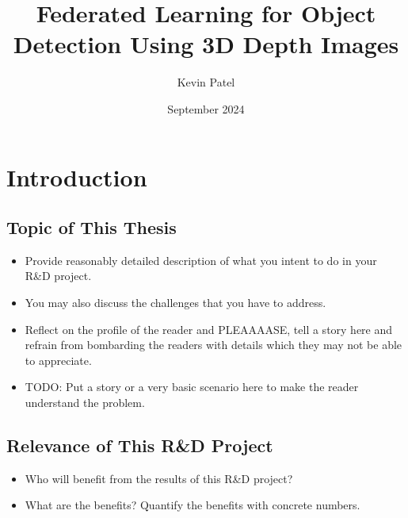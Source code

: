 \documentclass[thesis]{mas_proposal}
\title{Federated Learning for Object Detection Using 3D Depth Images}
\author{Kevin Patel}
\date{September 2024}
\begin{document}
\maketitle

\pagestyle{plain}

\section{Introduction}

\subsection{Topic of This Thesis}
\begin{itemize}
      \item Provide reasonably detailed description of what you intent to do in your R\&D project.
      \item You may also discuss the challenges that you have to address.
      \item Reflect on the profile of the reader and PLEAAAASE, tell a story here and refrain from bombarding the readers with details which they may not be able to appreciate.

      \item TODO: Put a story or a very basic scenario here to make the reader understand the problem.


\end{itemize}

\subsection{Relevance of This R\&D Project}
\begin{itemize}

      \item Who will benefit from the results of this R\&D project?
      \item What are the benefits? Quantify the benefits with concrete numbers.
\end{itemize}
\end{document}
